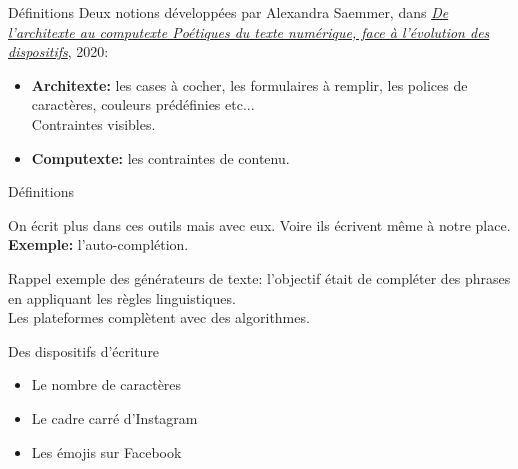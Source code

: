 \begin{frame}{Définitions}
    Deux notions développées par Alexandra Saemmer, dans \href{https://shs.cairn.info/revue-communication-et-langages-2020-1-page-99?lang=fr}{\textit{De l’architexte au computexte Poétiques du texte numérique, face à l’évolution des dispositifs}}, 2020:\\
    \begin{itemize}
        \item \textbf{Architexte:} les cases à cocher, les formulaires à remplir, les polices de caractères, couleurs prédéfinies etc...\\
        \textrightarrow{} Contraintes visibles.
        \item \textbf{Computexte:} les contraintes de contenu.
    \end{itemize}
\end{frame}

\begin{frame}{Définitions}
    \begin{block}{}
    On écrit plus dans ces outils mais avec eux. Voire ils écrivent même à notre place.\\
    \textbf{Exemple:} l'auto-complétion.
    \end{block}
    \begin{block}{}
        Rappel exemple des générateurs de texte: l'objectif était de compléter des phrases en appliquant les règles linguistiques.\\
        \textrightarrow{} Les plateformes complètent avec des algorithmes.
    \end{block}
\end{frame}

\begin{frame}{Des dispositifs d'écriture}
    \begin{itemize}
        \item Le nombre de caractères
        \item Le cadre carré d'Instagram
        \item Les émojis sur Facebook
    \end{itemize}
\end{frame}

